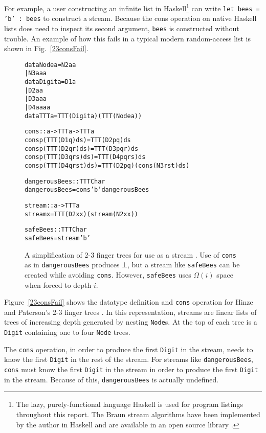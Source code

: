 \documentclass[envcountsect]{llncs}
\begin{document}
For example, a user constructing an infinite list in 
Haskell\footnote{The lazy, purely-functional language Haskell \cite{haskellReport} is used for program listings throughout this report.
The Braun stream algorithms have been implemented by the author in Haskell and are available in an open source library \cite{website}. } 
can write {\tt let bees = 'b' : bees} to construct a stream.
Because the cons operation on native Haskell lists does need to inspect its second argument, {\tt bees} is constructed without trouble.
An example of how this fails in a typical modern random-access list is shown in Fig.~\ref{23consFail}.

\begin{figure}
\begin{alltt}
data Node a = N2 a a
            | N3 a a a
data Digit a = D1 a
             | D2 a a
             | D3 a a a
             | D4 a a a a
data TTT a = TTT (Digit a) (TTT (Node a))

cons :: a -> TTT a -> TTT a
cons p (TTT (D1 q)       ds) = TTT (D2 p q) ds
cons p (TTT (D2 q r)     ds) = TTT (D3 p q r) ds
cons p (TTT (D3 q r s)   ds) = TTT (D4 p q r s) ds
cons p (TTT (D4 q r s t) ds) = TTT (D2 p q) (cons (N3 r s t) ds)

dangerousBees :: TTT Char
dangerousBees = cons 'b' dangerousBees

stream :: a -> TTT a
stream x = TTT (D2 x x) (stream (N2 x x))

safeBees :: TTT Char
safeBees = stream 'b'
\end{alltt}
\caption{
A simplification of 2-3 finger trees for use as a stream \cite{HinzePat}. 
Use of {\tt cons} as in {\tt dangerousBees} produces $\bot$, but a stream like {\tt safeBees} can be created while avoiding {\tt cons}.
However, {\tt safeBees} uses $\Omega(i)$ space when forced to depth $i$.
}
\label{23consFail}
\label{23stream}
\end{figure}

Figure~\ref{23consFail} shows the datatype definition and {\tt cons} operation for Hinze and Paterson's 2-3 finger trees \cite{HinzePat}.
In this representation, streams are linear lists of trees of increasing depth generated by nesting {\tt Node}s.
At the top of each tree is a {\tt Digit} containing one to four {\tt Node} trees.

The {\tt cons} operation, in order to produce the first {\tt Digit} in the stream, needs to know the first {\tt Digit} in the rest of the stream.
For streams like {\tt dangerousBees}, {\tt cons} must know the first {\tt Digit} in the stream in order to produce the first {\tt Digit} in the stream.
Because of this, {\tt dangerousBees} is actually undefined.
\end{document}
